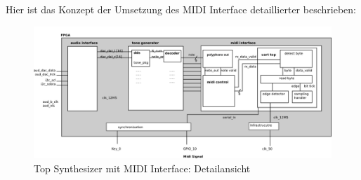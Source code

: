 Hier ist das Konzept der Umsetzung des MIDI Interface detaillierter beschrieben:\\
\begin{figure}[H]
	\centering
	\includegraphics[width=1\textwidth]{images/midi_interface/top_synthesizer_detail.png}
	\caption{Top Synthesizer mit MIDI Interface: Detailansicht}
	\label{fig.top_synthesizer_detail}
\end{figure}




